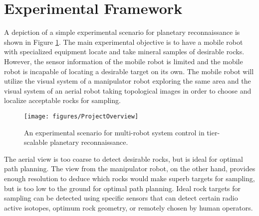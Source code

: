 
  \section{Experimental Framework}

    A depiction of a simple experimental scenario for planetary reconnaissance
      is shown in Figure \ref{fig:overview}.
    The main experimental objective is to have a mobile robot with specialized 
      equipment locate and take mineral samples of desirable rocks.
    However, the sensor information of the mobile robot is limited and the 
      mobile robot is incapable of locating a desirable target on its own.
    The mobile robot will utilize the visual system of a manipulator robot 
      exploring the same area and the visual system of an aerial robot taking 
      topological images in order to choose and localize acceptable rocks for 
      sampling.
    \begin{figure}%
    \centerline{\texttt{[image: figures/ProjectOverview]}}
       \caption{An experimental scenario for multi-robot system control
         in tier-scalable planetary reconnaissance.}
       \label{fig:overview}
    \end{figure}
    The aerial view is too coarse to detect desirable rocks, but is ideal for 
      optimal path planning.
    The view from the manipulator robot, on the other hand, provides enough 
      resolution to deduce which rocks would make superb targets for sampling, 
      but is too low to the ground for optimal path planning.
    Ideal rock targets for sampling can be detected using specific sensors 
      that can detect certain radio active isotopes, optimum rock geometry, or 
      remotely chosen by human operators.

